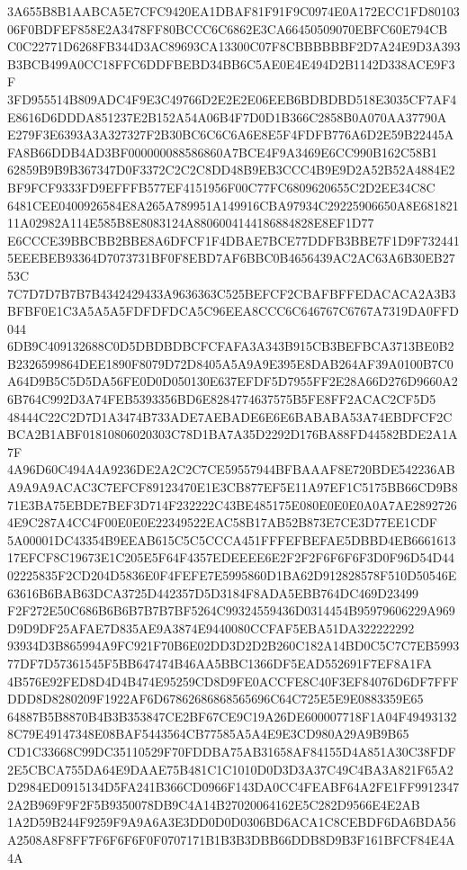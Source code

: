 \documentclass[UTF8,fontset=fandol,zihao=-4,a4paper]{ctexart}
\begin{document}
{{3A655B8B1AABCA5E7CFC9420EA1DBAF81F91F9C0974E0A172ECC1FD8010306F0BDFEF858E2A3478FF80BCCC6C6862E3CA66450509070EBFC60E794CB
C0C22771D6268FB344D3AC89693CA13300C07F8CBBBBBBF2D7A24E9D3A393B3BCB499A0CC18FFC6DDFBEBD34BB6C5AE0E4E494D2B1142D338ACE9F3F
3FD955514B809ADC4F9E3C49766D2E2E2E06EEB6BDBDBD518E3035CF7AF4E8616D6DDDA851237E2B152A54A06B4F7D0D1B366C2858B0A070AA37790A
E279F3E6393A3A327327F2B30BC6C6C6A6E8E5F4FDFB776A6D2E59B22445AFA8B66DDB4AD3BF000000088586860A7BCE4F9A3469E6CC990B162C58B1
62859B9B9B367347D0F3372C2C2C8DD48B9EB3CCC4B9E9D2A52B52A4884E2BF9FCF9333FD9EFFFB577EF4151956F00C77FC6809620655C2D2EE34C8C
6481CEE0400926584E8A265A789951A149916CBA97934C29225906650A8E68182111A02982A114E585B8E8083124A8806004144186884828E8EF1D77
E6CCCE39BBCBB2BBE8A6DFCF1F4DBAE7BCE77DDFB3BBE7F1D9F7324415EEEBEB93364D7073731BF0F8EBD7AF6BBC0B4656439AC2AC63A6B30EB2753C
7C7D7D7B7B7B4342429433A9636363C525BEFCF2CBAFBFFEDACACA2A3B3BFBF0E1C3A5A5A5FDFDFDCA5C96EEA8CCC6C646767C6767A7319DA0FFD044
6DB9C409132688C0D5DBDBDBCFCFAFA3A343B915CB3BEFBCA3713BE0B2B2326599864DEE1890F8079D72D8405A5A9A9E395E8DAB264AF39A0100B7C0
A64D9B5C5D5DA56FE0D0D050130E637EFDF5D7955FF2E28A66D276D9660A26B764C992D3A74FEB5393356BD6E8284774637575B5FE8FF2ACAC2CF5D5
48444C22C2D7D1A3474B733ADE7AEBADE6E6E6BABABA53A74EBDFCF2CBCA2B1ABF01810806020303C78D1BA7A35D2292D176BA88FD44582BDE2A1A7F
4A96D60C494A4A9236DE2A2C2C7CE59557944BFBAAAF8E720BDE542236ABA9A9A9ACAC3C7EFCF89123470E1E3CB877EF5E11A97EF1C5175BB66CD9B8
71E3BA75EBDE7BEF3D714F232222C43BE485175E080E0E0E0A0A7AE28927264E9C287A4CC4F00E0E0E22349522EAC58B17AB52B873E7CE3D77EE1CDF
5A00001DC43354B9EEAB615C5C5CCCA451FFFEFBEFAE5DBBD4EB666161317EFCF8C19673E1C205E5F64F4357EDEEEE6E2F2F2F6F6F6F3D0F96D54D44
02225835F2CD204D5836E0F4FEFE7E5995860D1BA62D912828578F510D50546E63616B6BAB63DCA3725D442357D5D3184F8ADA5EBB764DC469D23499
F2F272E50C686B6B6B7B7B7BF5264C99324559436D0314454B95979606229A969D9D9DF25AFAE7D835AE9A3874E9440080CCFAF5EBA51DA322222292
93934D3B865994A9FC921F70B6E02DD3D2D2B260C182A14BD0C5C7C7EB599377DF7D57361545F5BB647474B46AA5BBC1366DF5EAD552691F7EF8A1FA
4B576E92FED8D4D4B474E95259CD8D9FE0ACCFE8C40F3EF84076D6DF7FFFDDD8D8280209F1922AF6D67862686868565696C64C725E5E9E0883359E65
64887B5B8870B4B3B353847CE2BF67CE9C19A26DE600007718F1A04F494931328C79E49147348E08BAF5443564CB77585A5A4E9E3CD980A29A9B9B65
CD1C33668C99DC35110529F70FDDBA75AB31658AF84155D4A851A30C38FDF2E5CBCA755DA64E9DAAE75B481C1C1010D0D3D3A37C49C4BA3A821F65A2
D2984ED0915134D5FA241B366CD0966F143DA0CC4FEABF64A2FE1FF99123472A2B969F9F2F5B9350078DB9C4A14B27020064162E5C282D9566E4E2AB
1A2D59B244F9259F9A9A6A3E3DD0D0D0306BD6ACA1C8CEBDF6DA6BDA56A2508A8F8FF7F6F6F6F0F0707171B1B3B3DBB66DDB8D9B3F161BFCF84E4A4A
}}
\end{document}
